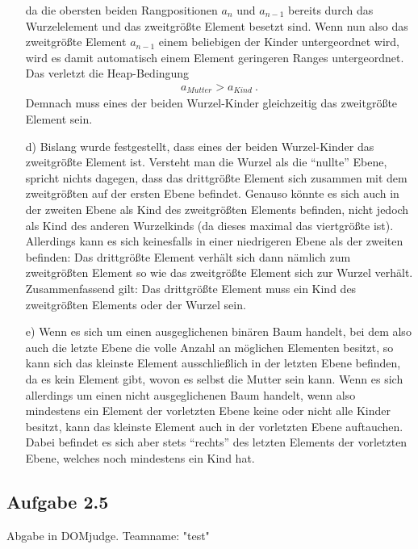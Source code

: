 \documentclass{article}
\begin{document}
\begin{enumerate}
        da die obersten beiden Rangpositionen $a_n$ und $a_{n-1}$ bereits durch das Wurzelelement und das zweitgrößte Element besetzt sind.
        Wenn nun also das zweitgrößte Element $a_{n-1}$ einem beliebigen der Kinder untergeordnet wird, wird es damit automatisch einem Element geringeren Ranges untergeordnet. Das verletzt die Heap-Bedingung
        \begin{align*}
            a_{Mutter} > a_{Kind} \:.
        \end{align*}
        Demnach muss eines der beiden Wurzel-Kinder gleichzeitig das zweitgrößte Element sein.
        \item[d)] Bislang wurde festgestellt, dass eines der beiden Wurzel-Kinder das zweitgrößte Element ist. Versteht man die Wurzel als die "`nullte"' Ebene, spricht nichts dagegen, dass das drittgrößte Element sich zusammen mit dem zweitgrößten auf der ersten Ebene befindet. Genauso könnte es sich auch in der zweiten Ebene als Kind des zweitgrößten Elements befinden, nicht jedoch als Kind des anderen Wurzelkinds (da dieses maximal das viertgrößte ist). Allerdings kann es sich keinesfalls in einer niedrigeren Ebene als der zweiten befinden: Das drittgrößte Element verhält sich dann nämlich zum zweitgrößten Element so wie das zweitgrößte Element sich zur Wurzel verhält. Zusammenfassend gilt: Das drittgrößte Element muss ein Kind des zweitgrößten Elements oder der Wurzel sein.
        \item[e)] Wenn es sich um einen ausgeglichenen binären Baum handelt, bei dem also auch die letzte Ebene die volle Anzahl an möglichen Elementen besitzt, so kann sich das kleinste Element ausschließlich in der letzten Ebene befinden, da es kein Element gibt, wovon es selbst die Mutter sein kann. Wenn es sich allerdings um einen nicht ausgeglichenen Baum handelt, wenn also mindestens ein Element der vorletzten Ebene keine oder nicht alle Kinder besitzt, kann das kleinste Element auch in der vorletzten Ebene auftauchen. Dabei befindet es sich aber stets "`rechts"' des letzten Elements der vorletzten Ebene, welches noch mindestens ein Kind hat. 
    \end{enumerate}


    \subsection*{Aufgabe 2.5}
    Abgabe in DOMjudge. Teamname: "test"
\end{document}
